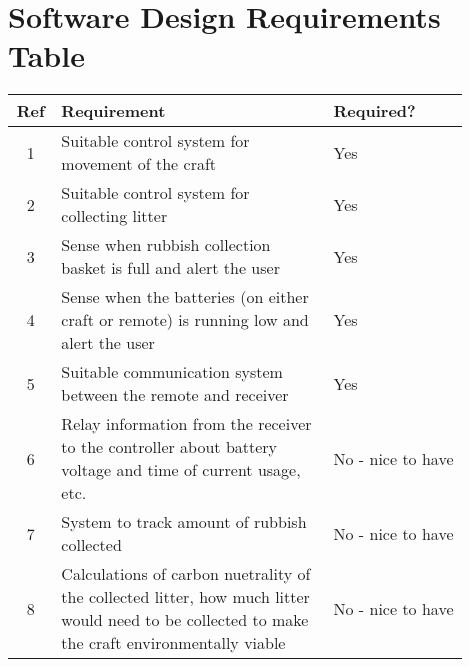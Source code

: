 \documentclass [11pt]{article}
\begin{document}
\section{Software Design Requirements Table}\label{app:design_requirements_software}

\begin{table}[H]
\begin{tabular}{||c||p{0.6\linewidth}|p{0.3\linewidth}||}
\hline
Ref & Requirement                                                                                                                                  & Required?         \\ 
\hline
1   & Suitable control system for movement of the craft                                                                                              & Yes               \\
\hline
2   & Suitable control system for collecting litter                                                                                                  & Yes               \\
\hline
3   & Sense when rubbish collection basket is full and alert the user                                                                                & Yes               \\
\hline
4   & Sense when the batteries (on either craft or remote) is running low and alert the user                                                         & Yes               \\
\hline
5   & Suitable communication system between the remote and receiver                                                                                  & Yes               \\
\hline
6   & Relay information from the receiver to the controller about battery voltage and time of current usage, etc.                                    & No - nice to have \\
\hline
7   & System to track amount of rubbish collected                                                                                                    & No - nice to have \\
\hline
8   & Calculations of carbon nuetrality of the collected litter, how much litter would need to be collected to make the craft environmentally viable & No - nice to have \\
\hline
\end{tabular}
\end{table}
\end{document}
